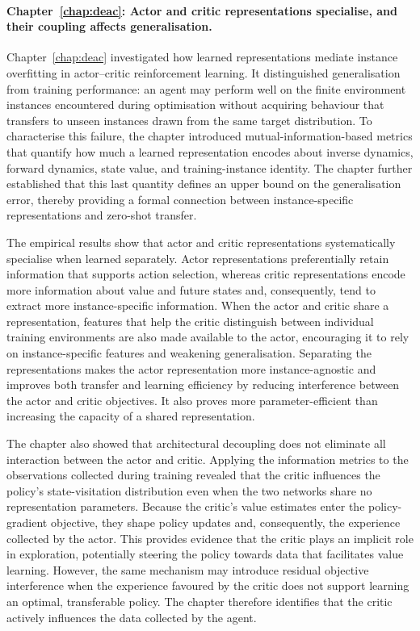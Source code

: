 \paragraph{Chapter~\ref{chap:deac}: Actor and critic representations specialise, and their coupling affects generalisation.}
Chapter~\ref{chap:deac} investigated how learned representations mediate instance overfitting in actor--critic reinforcement learning. It distinguished generalisation from training performance: an agent may perform well on the finite environment instances encountered during optimisation without acquiring behaviour that transfers to unseen instances drawn from the same target distribution. To characterise this failure, the chapter introduced mutual-information-based metrics that quantify how much a learned representation encodes about inverse dynamics, forward dynamics, state value, and training-instance identity. The chapter further established that this last quantity defines an upper bound on the generalisation error, thereby providing a formal connection between instance-specific representations and zero-shot transfer.

The empirical results show that actor and critic representations systematically specialise when learned separately. Actor representations preferentially retain information that supports action selection, whereas critic representations encode more information about value and future states and, consequently, tend to extract more instance-specific information. When the actor and critic share a representation, features that help the critic distinguish between individual training environments are also made available to the actor, encouraging it to rely on instance-specific features and weakening generalisation. Separating the representations makes the actor representation more instance-agnostic and improves both transfer and learning efficiency by reducing interference between the actor and critic objectives. It also proves more parameter-efficient than increasing the capacity of a shared representation.

The chapter also showed that architectural decoupling does not eliminate all interaction between the actor and critic. Applying the information metrics to the observations collected during training revealed that the critic influences the policy's state-visitation distribution even when the two networks share no representation parameters. Because the critic's value estimates enter the policy-gradient objective, they shape policy updates and, consequently, the experience collected by the actor. This provides evidence that the critic plays an implicit role in exploration, potentially steering the policy towards data that facilitates value learning. However, the same mechanism may introduce residual objective interference when the experience favoured by the critic does not support learning an optimal, transferable policy. The chapter therefore identifies that the critic actively influences the data collected by the agent.

